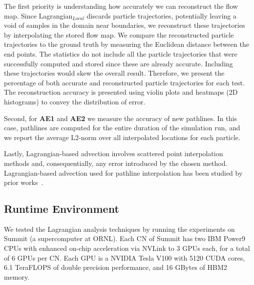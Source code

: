 The first priority is understanding how accurately we can reconstruct the flow map. 
%
Since Lagrangian$_{Local}$ discards particle trajectories, potentially leaving a void of samples in the domain near boundaries, we reconstruct these trajectories by interpolating the stored flow map.
%
We compare the reconstructed particle trajectories to the ground truth by measuring the Euclidean distance between the end points.
%
The statistics do not include all the particle trajectories that were successfully computed and stored since these are already accurate.
%
Including these trajectories would skew the overall result.
%
Therefore, we present the percentage of both accurate and reconstructed particle trajectories for each test.
%
The reconstruction accuracy is presented using violin plots and heatmaps (2D histograms) to convey the distribution of error. 

Second, for \textbf{AE1} and \textbf{AE2} we measure the accuracy of new pathlines.
%
In this case, pathlines are computed for the entire duration of the simulation run, and we report the average L2-norm over all interpolated locations for each particle.
%

Lastly, Lagrangian-based advection involves scattered point interpolation methods and, consequentially, any error introduced by the chosen method.
%
Lagrangian-based advection used for pathline interpolation has been studied by prior works~\cite{agranovsky2015subsampling, bujack2015lagrangian, hummel2016error, sane2018revisiting, sane2019interpolation}. 
\subsection{Runtime Environment}
We tested the Lagrangian analysis techniques by running the experiments on Summit (a supercomputer at ORNL).
%
Each CN of Summit has two IBM Power9 CPUs
%
with enhanced on-chip acceleration via NVLink to 3 GPUs each, for a total of 6 GPUs per CN.
%
Each GPU is a NVIDIA Tesla V100 with 5120 CUDA cores, 6.1 TeraFLOPS of double precision performance, and 16 GBytes of HBM2 memory.
